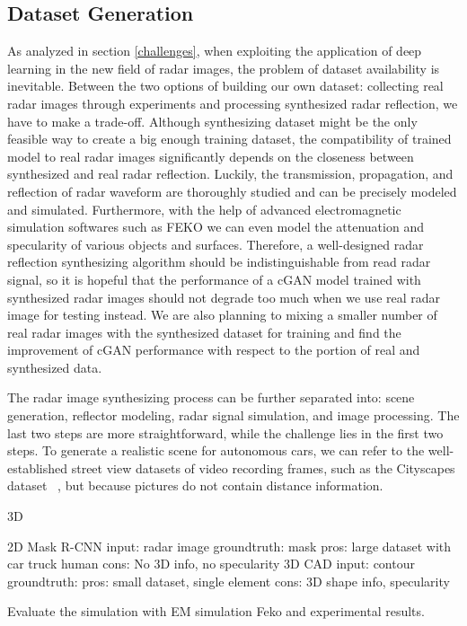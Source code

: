 \subsection{Dataset Generation}
As analyzed in section \ref{challenges}, when exploiting the application of deep learning in the new field of radar images, the problem of dataset availability is inevitable. Between the two options of building our own dataset: collecting real radar images through experiments and processing synthesized radar reflection, we have to make a trade-off. Although synthesizing dataset might be the only feasible way to create a big enough training dataset, the compatibility of trained model to real radar images significantly depends on the closeness between synthesized  and real radar reflection. Luckily, the transmission, propagation, and reflection of radar waveform are thoroughly studied and can be precisely modeled and simulated. Furthermore, with the help of advanced electromagnetic simulation softwares such as FEKO we can even model the attenuation and specularity of various objects and surfaces. Therefore, a well-designed radar reflection synthesizing algorithm should be indistinguishable from read radar signal, so it is hopeful that the performance of a cGAN model trained with synthesized radar images should not degrade too much when we use real radar image for testing instead. We are also planning to mixing a smaller number of real radar images with the synthesized dataset for training and find the improvement of cGAN performance with respect to the portion of real and synthesized data.  

The radar image synthesizing process can be further separated into: scene generation, reflector modeling, radar signal simulation, and image processing. The last two steps are more straightforward, while the challenge lies in the first two steps. To generate a realistic scene for autonomous cars, we can refer to the well-established street view datasets of video recording frames, such as the Cityscapes dataset ~\cite{cityscapes}, but because pictures do not contain distance information. 

3D %

2D
	Mask R-CNN
		input: radar image
		groundtruth: mask
	pros: large dataset with car truck human 
	cons: No 3D info, no specularity
	3D CAD
		input: contour
		groundtruth:
	pros: small dataset, single element 
	cons: 3D shape info, specularity 


Evaluate the simulation with EM simulation Feko and experimental results.

